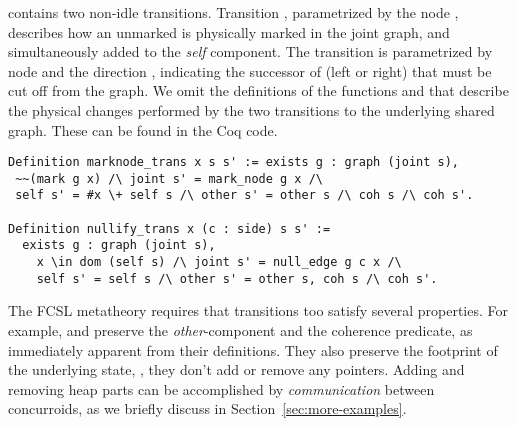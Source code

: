 
%
 contains two non-idle transitions. Transition
, parametrized by the node , 
describes how an unmarked  is physically marked in the joint
graph, and simultaneously added to the \emph{self} component.  The
transition  is parametrized by node  and
the direction , indicating the successor of  (left or
right) that must be cut off from the graph. We omit the definitions of the
functions  and  that describe the
physical changes performed by the two transitions to the underlying
shared graph. These can be found in the Coq code.
%
%
\begin{lstlisting}
Definition marknode_trans x s s' := exists g : graph (joint s),
 ~~(mark g x) /\ joint s' = mark_node g x /\
 self s' = #x \+ self s /\ other s' = other s /\ coh s /\ coh s'.  

Definition nullify_trans x (c : side) s s' := 
  exists g : graph (joint s), 
    x \in dom (self s) /\ joint s' = null_edge g c x /\
    self s' = self s /\ other s' = other s, coh s /\ coh s'.  
\end{lstlisting} 
%
%   
%  

The FCSL metatheory requires that transitions too satisfy several
properties. For example,  and
\code{nullify_trans} preserve the \emph{other}-component and the
coherence predicate, as immediately apparent from their
definitions. They also preserve the footprint of the underlying state,
\ie, they don't add or remove any pointers. Adding and removing heap
parts can be accomplished by \emph{communication} between concurroids,
as we briefly discuss in Section~\ref{sec:more-examples}.

